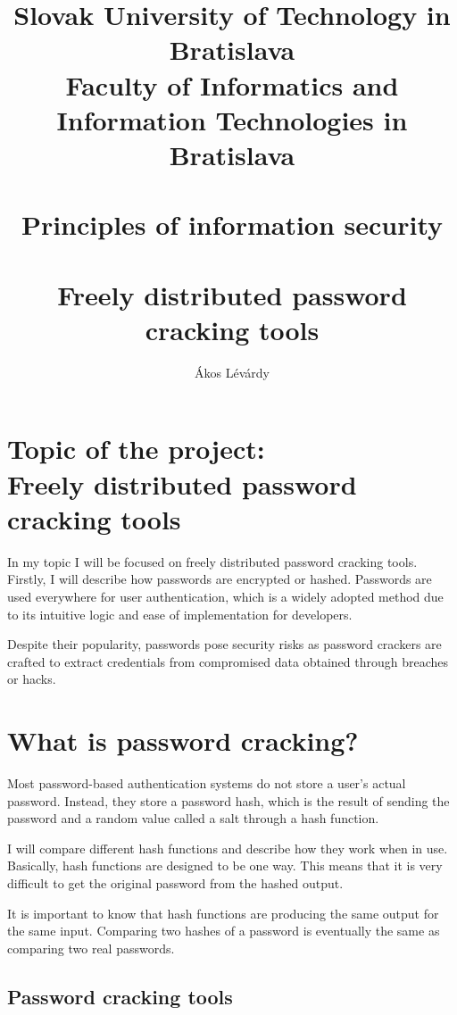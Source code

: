 \documentclass[10pt,oneside,english,a4paper]{article}
\title{\huge \textbf{Slovak University of Technology in Bratislava
\\Faculty of Informatics and Information Technologies in Bratislava}\\
\ \\
Principles of information security\\
\ \\
Freely distributed password cracking tools}
\author{Ákos Lévárdy}
\begin{document}
\maketitle

\pagebreak

\tableofcontents

\pagebreak

\section{Topic of the project: \\Freely distributed password cracking tools}
In my topic I will be focused on freely distributed password cracking tools. Firstly, I will describe how passwords are encrypted or hashed. Passwords are used everywhere for user authentication, which is a widely adopted method due to its intuitive logic and ease of implementation for developers. 

Despite their popularity, passwords pose security risks as password crackers are crafted to extract credentials from compromised data obtained through breaches or hacks.

\section{What is password cracking?}

Most password-based authentication systems do not store a user’s actual password. Instead, they store a password hash, which is the result of sending the password and a random value called a salt through a hash function.

I will compare different hash functions and describe how they work when in use. Basically, hash functions are designed to be one way. This means that it is very difficult to get the original password from the hashed output. 

It is important to know that hash functions are producing the same output for the same input. Comparing two hashes of a password is eventually the same as comparing two real passwords.


\subsection{Password cracking tools}
\end{document}
